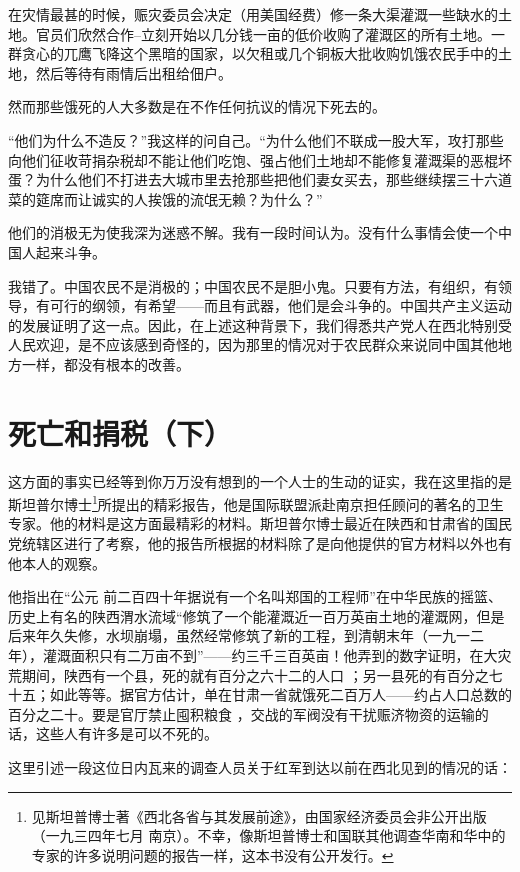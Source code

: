 \documentclass[10pt]{book}
\begin{document}
在灾情最甚的时候，赈灾委员会决定（用美国经费）修一条大渠灌溉一些缺水的土地。官员们欣然合作--立刻开始以几分钱一亩的低价收购了灌溉区的所有土地。一群贪心的兀鹰飞降这个黑暗的国家，以欠租或几个铜板大批收购饥饿农民手中的土地，然后等待有雨情后出租给佃户。

然而那些饿死的人大多数是在不作任何抗议的情况下死去的。

“他们为什么不造反？”我这样的问自己。“为什么他们不联成一股大军，攻打那些向他们征收苛捐杂税却不能让他们吃饱、强占他们土地却不能修复灌溉渠的恶棍坏蛋？为什么他们不打进去大城市里去抢那些把他们妻女买去，那些继续摆三十六道菜的筵席而让诚实的人挨饿的流氓无赖？为什么？”

他们的消极无为使我深为迷惑不解。我有一段时间认为。没有什么事情会使一个中国人起来斗争。

我错了。中国农民不是消极的；中国农民不是胆小鬼。只要有方法，有组织，有领导，有可行的纲领，有希望——而且有武器，他们是会斗争的。中国共产主义运动的发展证明了这一点。因此，在上述这种背景下，我们得悉共产党人在西北特别受人民欢迎，是不应该感到奇怪的，因为那里的情况对于农民群众来说同中国其他地方一样，都没有根本的改善。

\section{死亡和捐税（下）}

这方面的事实已经等到你万万没有想到的一个人士的生动的证实，我在这里指的是斯坦普尔博士\footnote{见斯坦普博士著《西北各省与其发展前途》，由国家经济委员会非公开出版（一九三四年七月 南京）。不幸，像斯坦普博士和国联其他调查华南和华中的专家的许多说明问题的报告一样，这本书没有公开发行。}所提出的精彩报告，他是国际联盟派赴南京担任顾问的著名的卫生专家。他的材料是这方面最精彩的材料。斯坦普尔博士最近在陕西和甘肃省的国民党统辖区进行了考察，他的报告所根据的材料除了是向他提供的官方材料以外也有他本人的观察。

他指出在“公元 前二百四十年据说有一个名叫郑国的工程师”在中华民族的摇篮、历史上有名的陕西渭水流域“修筑了一个能灌溉近一百万英亩土地的灌溉网，但是后来年久失修，水坝崩塌，虽然经常修筑了新的工程，到清朝末年（一九一二年），灌溉面积只有二万亩不到”——约三千三百英亩！他弄到的数字证明，在大灾荒期间，陕西有一个县，死的就有百分之六十二的人口 ；另一县死的有百分之七十五；如此等等。据官方估计，单在甘肃一省就饿死二百万人——约占人口总数的百分之二十。要是官厅禁止囤积粮食 ，交战的军阀没有干扰赈济物资的运输的话，这些人有许多是可以不死的。

这里引述一段这位日内瓦来的调查人员关于红军到达以前在西北见到的情况的话：
\end{document}
